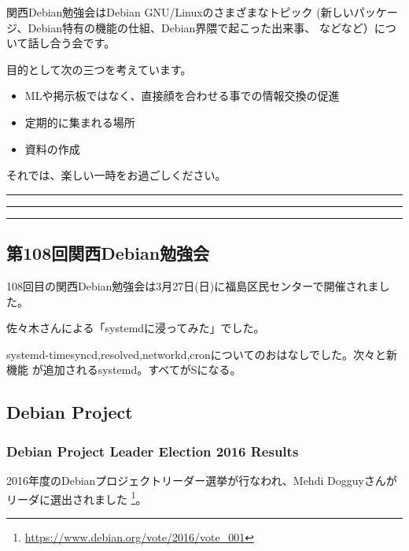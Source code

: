 \documentclass[mingoth,a4paper]{jsarticle}
\begin{document}
\vspace{1em}

関西Debian勉強会はDebian GNU/Linuxのさまざまなトピック
(新しいパッケージ、Debian特有の機能の仕組、Debian界隈で起こった出来事、
などなど）について話し合う会です。

目的として次の三つを考えています。
\begin{itemize}
\item MLや掲示板ではなく、直接顔を合わせる事での情報交換の促進
\item 定期的に集まれる場所
\item 資料の作成
\end{itemize}

 それでは、楽しい一時をお過ごしください。

\newpage

\begin{minipage}[b]{0.2\hsize}
  {}
\end{minipage}
\begin{minipage}[b]{0.8\hsize}
\hrule
\vspace{2mm}
\hrule
\setcounter{tocdepth}{1}
\tableofcontents
\vspace{2mm}
\hrule
\end{minipage}


\subsection{第108回関西Debian勉強会}

108回目の関西Debian勉強会は3月27日(日)に福島区民センターで開催されました。

佐々木さんによる「systemdに浸ってみた」でした。

systemd-{timesyncd,resolved,networkd,cron}についてのおはなしでした。次々と新機能
が追加されるsystemd。すべてがSになる。

\subsection{Debian Project}

\subsubsection{Debian Project Leader Election 2016 Results}

2016年度のDebianプロジェクトリーダー選挙が行なわれ、Mehdi Dogguyさんがリーダに選出されました%
\footnote{\url{https://www.debian.org/vote/2016/vote_001}}。
\end{document}
